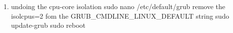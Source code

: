 \begin{enumerate}
                                                                                                                                                                              \item undoing the cpu-core isolation                                                                                                                          
    \tab sudo nano /etc/default/grub                                                                                                                              
    \tab remove the isolcpus=2 fom the GRUB_CMDLINE_LINUX_DEFAULT string                                                                                           
    \tab sudo update-grub                                                                                                                                             
    \tab sudo reboot                                                                                                                                                           
\end{enumerate}





